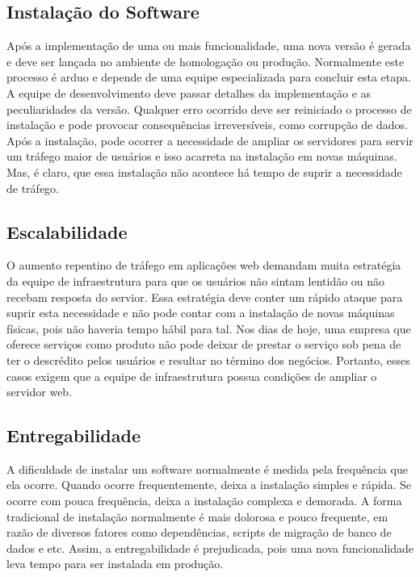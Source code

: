 \documentclass[
	12pt,				%
	openright,			%
	oneside,			%
	a4paper,			%
	chapter=TITLE,		%
	section=TITLE,		%
	english,			%
	french,				%
	spanish,			%
	brazil				%
	]{abntex2}
\begin{document}
\subsection{Instalação do Software}

Após a implementação de uma ou mais funcionalidade, uma nova versão é gerada e deve ser lançada no ambiente de homologação ou produção. Normalmente este processo é arduo e depende de uma equipe especializada para concluir esta etapa. A equipe de desenvolvimento deve passar detalhes da implementação e as peculiaridades da versão. Qualquer erro ocorrido deve ser reiniciado o processo de instalação e pode provocar consequências irreversíveis, como corrupção de dados. Após a instalação, pode ocorrer a necessidade de ampliar os servidores para servir um tráfego maior de usuários e isso acarreta na instalação em novas máquinas. Mas, é claro, que essa instalação não acontece há tempo de suprir a necessidade de tráfego.

\subsection{Escalabilidade}

O aumento repentino de tráfego em aplicações web demandam muita estratégia da equipe de infraestrutura para que os usuários não sintam lentidão ou não recebam resposta do servior. Essa estratégia deve conter um rápido ataque para suprir esta necessidade e não pode contar com a instalação de novas máquinas físicas, pois não haveria tempo hábil para tal. Nos dias de hoje, uma empresa que oferece serviços como produto não pode deixar de prestar o serviço sob pena de ter o descrédito pelos usuários e resultar no término dos negócios. Portanto, esses casos exigem que a equipe de infraestrutura possua condições de ampliar o servidor web.

\subsection{Entregabilidade}

A dificuldade de instalar um software normalmente é medida pela frequência que ela ocorre. Quando ocorre frequentemente, deixa a instalação simples e rápida. Se ocorre com pouca frequência, deixa a instalação complexa e demorada. A forma tradicional de instalação normalmente é mais dolorosa e pouco frequente, em razão de diversos fatores como dependências, scripts de migração de banco de dados e etc. Assim, a entregabilidade é prejudicada, pois uma nova funcionalidade leva tempo para ser instalada em produção.
\end{document}
